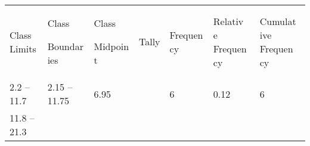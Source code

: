 \documentclass[]{book}
\begin{document}
\begin{longtable}[]{@{}lllllll@{}}
\toprule
\endhead
\begin{minipage}[t]{0.11\columnwidth}\raggedright
Class
Limits\strut
\end{minipage} & \begin{minipage}[t]{0.11\columnwidth}\raggedright
Class

Boundar
ies\strut
\end{minipage} & \begin{minipage}[t]{0.11\columnwidth}\raggedright
Class

Midpoin
t\strut
\end{minipage} & \begin{minipage}[t]{0.11\columnwidth}\raggedright
Tally\strut
\end{minipage} & \begin{minipage}[t]{0.11\columnwidth}\raggedright
Frequen
cy\strut
\end{minipage} & \begin{minipage}[t]{0.11\columnwidth}\raggedright
Relativ
e
Frequen
cy\strut
\end{minipage} & \begin{minipage}[t]{0.11\columnwidth}\raggedright
Cumulat
ive
Frequen
cy\strut
\end{minipage}\tabularnewline
\begin{minipage}[t]{0.11\columnwidth}\raggedright
2.2 --
11.7\strut
\end{minipage} & \begin{minipage}[t]{0.11\columnwidth}\raggedright
2.15 --
11.75\strut
\end{minipage} & \begin{minipage}[t]{0.11\columnwidth}\raggedright
6.95\strut
\end{minipage} & \begin{minipage}[t]{0.11\columnwidth}\raggedright
~\strut
\end{minipage} & \begin{minipage}[t]{0.11\columnwidth}\raggedright
6\strut
\end{minipage} & \begin{minipage}[t]{0.11\columnwidth}\raggedright
0.12\strut
\end{minipage} & \begin{minipage}[t]{0.11\columnwidth}\raggedright
6\strut
\end{minipage}\tabularnewline
\begin{minipage}[t]{0.11\columnwidth}\raggedright
11.8 --
21.3\strut
\end{minipage} & \begin{minipage}[t]{0.11\columnwidth}\raggedright
\hypertarget{section}{%
}
\end{minipage}
\end{longtable}
\end{document}

